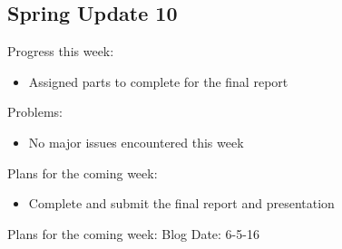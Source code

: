 \subsection{Spring Update 10}
Progress this week:
\begin{itemize}
\item Assigned parts to complete for the final report
\end{itemize}
Problems:
\begin{itemize}
\item No major issues encountered this week
\end{itemize}
Plans for the coming week: 
\begin{itemize}
\item Complete and submit the final report and presentation
\end{itemize}
Plans for the coming week: 
Blog Date: 6-5-16
